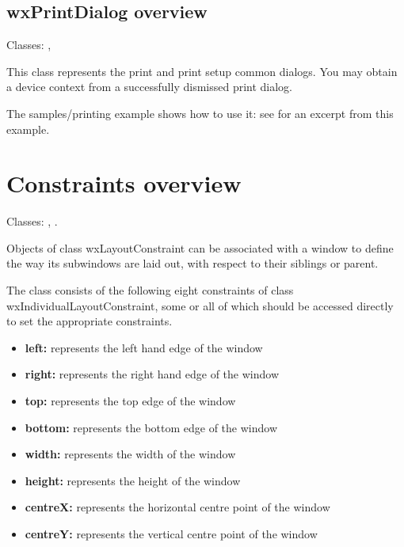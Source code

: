 \subsection{wxPrintDialog overview}\label{wxprintdialogoverview}

Classes: , 

This class represents the print and print setup common dialogs.
You may obtain a  device context from
a successfully dismissed print dialog.

The samples/printing example shows how to use it: see  for
an excerpt from this example.

\section{Constraints overview}\label{constraintsoverview}

Classes: , .

Objects of class wxLayoutConstraint can be associated with a window to define the
way its subwindows are laid out, with respect to their siblings or parent.

The class consists of the following eight constraints of class wxIndividualLayoutConstraint,
some or all of which should be accessed directly to set the appropriate
constraints.

\begin{itemize}\itemsep=0pt
\item {\bf left:} represents the left hand edge of the window
\item {\bf right:} represents the right hand edge of the window
\item {\bf top:} represents the top edge of the window
\item {\bf bottom:} represents the bottom edge of the window
\item {\bf width:} represents the width of the window
\item {\bf height:} represents the height of the window
\item {\bf centreX:} represents the horizontal centre point of the window
\item {\bf centreY:} represents the vertical centre point of the window
\end{itemize}

